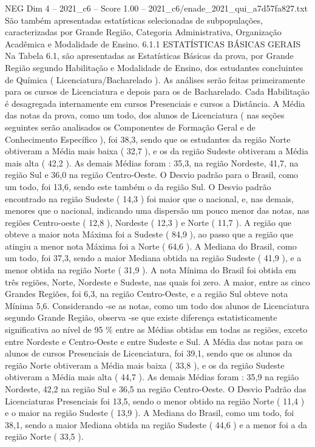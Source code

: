 \begin{textsample}{NEG Dim 4 – 2021\_c6 – Score 1.00 – 2021\_c6/enade\_2021\_qui\_a7d57fa827.txt}
São também apresentadas estatísticas selecionadas de subpopulações, caracterizadas por Grande Região, Categoria Administrativa, Organização Acadêmica e Modalidade de Ensino. 6.1.1 ESTATÍSTICAS BÁSICAS GERAIS Na Tabela 6.1, são apresentadas as Estatísticas Básicas da prova, por Grande Região segundo Habilitação e Modalidade de Ensino, dos estudantes concluintes de Química ( Licenciatura/Bacharelado ).
As análises serão feitas primeiramente para os cursos de Licenciatura e depois para os de Bacharelado.
Cada Habilitação é desagregada internamente em cursos Presenciais e cursos a Distância.
A Média das notas da prova, como um todo, dos alunos de Licenciatura ( nas seções seguintes serão analisados os Componentes de Formação Geral e de Conhecimento Específico ), foi 38,3, sendo que os estudantes da região Norte obtiveram a Média mais baixa ( 32,7 ), e os da região Sudeste obtiveram a Média mais alta ( 42,2 ).
As demais Médias foram : 35,3, na região Nordeste, 41,7, na região Sul e 36,0 na região Centro-Oeste.
O Desvio padrão para o Brasil, como um todo, foi 13,6, sendo este também o da região Sul.
O Desvio padrão encontrado na região Sudeste ( 14,3 ) foi maior que o nacional, e, nas demais, menores que o nacional, indicando uma dispersão um pouco menor das notas, nas regiões Centro-oeste ( 12,8 ), Nordeste ( 12,3 ) e Norte ( 11,7 ).
A região que obteve a maior nota Máxima foi a Sudeste ( 84,9 ), ao passo que a região que atingiu a menor nota Máxima foi a Norte ( 64,6 ).
A Mediana do Brasil, como um todo, foi 37,3, sendo a maior Mediana obtida na região Sudeste ( 41,9 ), e a menor obtida na região Norte ( 31,9 ).
A nota Mínima do Brasil foi obtida em três regiões, Norte, Nordeste e Sudeste, nas quais foi zero.
A maior, entre as cinco Grandes Regiões, foi 6,3, na região Centro-Oeste, e a região Sul obteve nota Mínima 5,6.
Considerando -se as notas, como um todo dos alunos de Licenciatura segundo Grande Região, observa -se que existe diferença estatisticamente significativa ao nível de 95 \% entre as Médias obtidas em todas as regiões, exceto entre Nordeste e Centro-Oeste e entre Sudeste e Sul.
A Média das notas para os alunos de cursos Presenciais de Licenciatura, foi 39,1, sendo que os alunos da região Norte obtiveram a Média mais baixa ( 33,8 ), e os da região Sudeste obtiveram a Média mais alta ( 44,7 ).
As demais Médias foram : 35,9 na região Nordeste, 42,2 na região Sul e 36,5 na região Centro-Oeste.
O Desvio Padrão das Licenciaturas Presenciais foi 13,5, sendo o menor obtido na região Norte ( 11,4 ) e o maior na região Sudeste ( 13,9 ).
A Mediana do Brasil, como um todo, foi 38,1, sendo a maior Mediana obtida na região Sudeste ( 44,6 ) e a menor foi a da região Norte ( 33,5 ).

\end{textsample}
